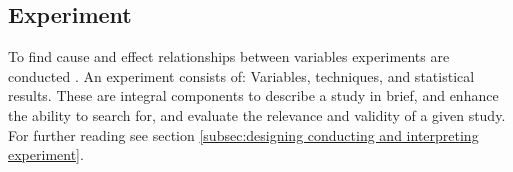 
\subsection{Experiment}
\label{subsec:experiment}

To find cause and effect relationships between variables experiments are conducted \cite{BuddiesVariables}. An experiment consists of: Variables, techniques, and statistical results. These are integral components to describe a study in brief, and enhance the ability to search for, and evaluate the relevance and validity of a given study.\\
For further reading see section \ref{subsec:designing conducting and interpreting experiment}.
